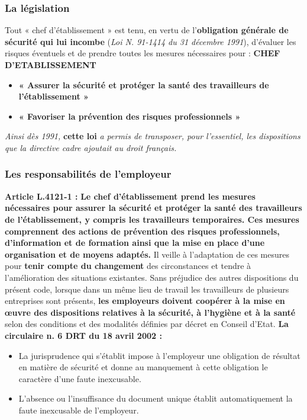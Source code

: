 \documentclass{beamer}
\begin{document}
\begin{frame}
\frametitle{La législation}
Tout « chef d’établissement » est tenu, 
en vertu de l’\textbf{obligation générale de sécurité qui lui incombe} (\textit{Loi N. 91-1414 du 31 décembre 1991}), d’évaluer les risques éventuels et de prendre toutes les mesures nécessaires pour :
\textbf{CHEF D’ETABLISSEMENT}
\begin{itemize}
\item \textbf{« Assurer la sécurité et protéger la santé des travailleurs de l’établissement »}
\item \textbf{« Favoriser la prévention des risques professionnels »}
\end{itemize}
\textit{Ainsi dès 1991,} \textbf{cette loi}\textit{ a permis de transposer, pour l'essentiel, les dispositions que la directive cadre ajoutait au droit français.}
\end{frame}

\begin{frame}
\frametitle{Les responsabilités de l’employeur}
\textbf{Article L.4121-1 :}
\textbf{Le chef d'établissement prend les mesures nécessaires pour assurer la sécurité et protéger la santé des travailleurs de l'établissement, y compris les travailleurs temporaires. Ces mesures comprennent des actions de prévention des risques professionnels, d'information et de formation ainsi que la mise en place d'une organisation et de moyens adaptés.} Il veille à l'adaptation de ces mesures pour \textbf{tenir compte du changement} des circonstances et tendre à l'amélioration des situations existantes. 
Sans préjudice des autres dispositions du présent code, lorsque dans un même lieu de travail les travailleurs de plusieurs entreprises sont présents, \textbf{les employeurs doivent coopérer à la mise en œuvre des dispositions relatives à la sécurité, à l'hygiène et à la santé} selon des conditions et des modalités définies par décret en Conseil d'Etat.
\textbf{La circulaire n.  6 DRT du 18 avril 2002 :}
\begin{itemize}
\item La jurisprudence qui s'établit impose à l'employeur une obligation de résultat en matière de sécurité et donne au manquement à cette obligation le caractère d'une faute inexcusable.
\item L'absence ou l'insuffisance du document unique établit automatiquement la faute inexcusable de l'employeur. 
\end{itemize}
\end{frame}
\end{document}
